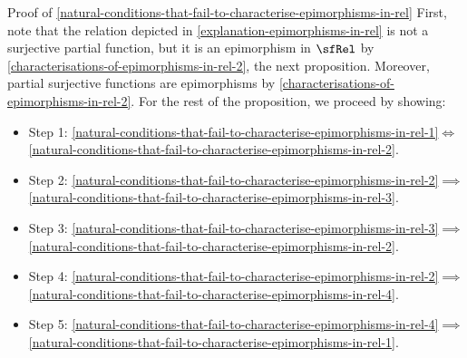 \begin{Proof}{Proof of \cref{natural-conditions-that-fail-to-characterise-epimorphisms-in-rel}}%
    First, note that the relation depicted in \cref{explanation-epimorphisms-in-rel} is not a surjective partial function, but it is an epimorphism in $\sfRel$ by \cref{characterisations-of-epimorphisms-in-rel-2}, the next proposition. Moreover, partial surjective functions are epimorphisms by \cref{characterisations-of-epimorphisms-in-rel-2}. For the rest of the proposition, we proceed by showing:
    \begin{itemize}
        \item Step 1: \cref{natural-conditions-that-fail-to-characterise-epimorphisms-in-rel-1}$\iff$\cref{natural-conditions-that-fail-to-characterise-epimorphisms-in-rel-2}.
        \item Step 2: \cref{natural-conditions-that-fail-to-characterise-epimorphisms-in-rel-2}$\implies$\cref{natural-conditions-that-fail-to-characterise-epimorphisms-in-rel-3}.
        \item Step 3: \cref{natural-conditions-that-fail-to-characterise-epimorphisms-in-rel-3}$\implies$\cref{natural-conditions-that-fail-to-characterise-epimorphisms-in-rel-2}.
        \item Step 4: \cref{natural-conditions-that-fail-to-characterise-epimorphisms-in-rel-2}$\implies$\cref{natural-conditions-that-fail-to-characterise-epimorphisms-in-rel-4}.
        \item Step 5: \cref{natural-conditions-that-fail-to-characterise-epimorphisms-in-rel-4}$\implies$\cref{natural-conditions-that-fail-to-characterise-epimorphisms-in-rel-1}.
    \end{itemize}


\end{Proof}
